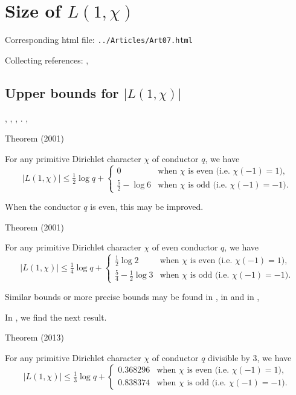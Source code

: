 \chapter{   Size of $L(1,\chi)$}

Corresponding html file: \texttt{../Articles/Art07.html}









Collecting references:
\cite{Louboutin*93},


\section{Upper bounds for $|L(1,\chi)|$}


\cite{Louboutin*96},
\cite{Louboutin*98},
\cite{Granville-Soundararajan*02},
\cite{Granville-Soundararajan*04}.
\cite{Ramare*01},


\begin{thm}{Theorem (2001)}

For any primitive Dirichlet character $\chi$ of conductor $q$,
we have
$$
|L(1,\chi)|\le\tfrac12\log q
+
\begin{cases}
0&\text{when $\chi$ is even (i.e. $\chi(-1)=1$),}\\
\tfrac52-\log 6&\text{when $\chi$ is odd (i.e. $\chi(-1)=-1$).}
\end{cases}
$$
\end{thm}


When the conductor $q$ is even, this may be improved.
\begin{thm}{Theorem (2001)}

For any primitive Dirichlet character $\chi$ of even conductor $q$,
we have
$$
|L(1,\chi)|\le\tfrac14\log q
+
\begin{cases}
\tfrac12\log 2&\text{when $\chi$ is even (i.e. $\chi(-1)=1$),}\\
\tfrac54-\tfrac12\log 3&\text{when $\chi$ is odd (i.e. $\chi(-1)=-1$).}
\end{cases}
$$
\end{thm}


Similar bounds or more precise bounds may be found in
\cite{Louboutin*02},
in
\cite{Ramare*02-??}
and in
\cite{Louboutin*18},
\par 
In
\cite{Platt-Eddin*13},
we find the next result.
\begin{thm}{Theorem (2013)}

For any primitive Dirichlet character $\chi$ of conductor $q$
divisible by 3,
we have
$$
|L(1,\chi)|\le\tfrac13\log q
+
\begin{cases}
0.368296&\text{when $\chi$ is even (i.e. $\chi(-1)=1$),}\\
0.838374&\text{when $\chi$ is odd (i.e. $\chi(-1)=-1$).}
\end{cases}
$$
\end{thm}

